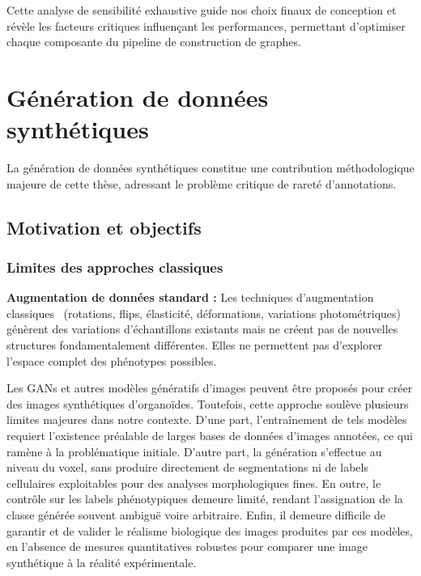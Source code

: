 Cette analyse de sensibilité exhaustive guide nos choix finaux de conception et révèle les facteurs critiques influençant les performances, permettant d'optimiser chaque composante du pipeline de construction de graphes.

\section{Génération de données synthétiques}

La génération de données synthétiques constitue une contribution méthodologique majeure de cette thèse, adressant le problème critique de rareté d'annotations.

\subsection{Motivation et objectifs}

\subsubsection{Limites des approches classiques}

\textbf{Augmentation de données standard :}
Les techniques d'augmentation classiques~\cite{Shorten2019} (rotations, flips, élasticité, déformations, variations photométriques) génèrent des variations d'échantillons existants mais ne créent pas de nouvelles structures fondamentalement différentes. Elles ne permettent pas d'explorer l'espace complet des phénotypes possibles.

Les GANs et autres modèles génératifs d'images peuvent être proposés pour créer des images synthétiques d'organoïdes. Toutefois, cette approche soulève plusieurs limites majeures dans notre contexte. D'une part, l'entraînement de tels modèles requiert l'existence préalable de larges bases de données d'images annotées, ce qui ramène à la problématique initiale. D'autre part, la génération s'effectue au niveau du voxel, sans produire directement de segmentations ni de labels cellulaires exploitables pour des analyses morphologiques fines. En outre, le contrôle sur les labels phénotypiques demeure limité, rendant l'assignation de la classe générée souvent ambiguë voire arbitraire. Enfin, il demeure difficile de garantir et de valider le réalisme biologique des images produites par ces modèles, en l'absence de mesures quantitatives robustes pour comparer une image synthétique à la réalité expérimentale.

